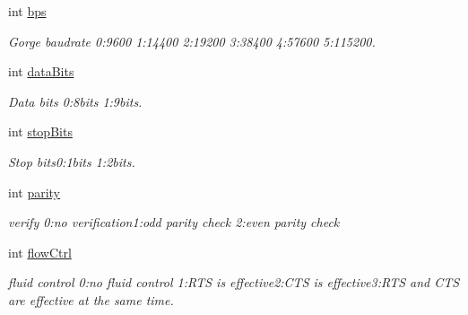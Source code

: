 \begin{DoxyCompactItemize}
\item 
\mbox{\label{struct_p_v_s_d_k___m_o_u_n_t_a_p_i___u_a_r_t___p_a_r_a_m_a2c76998e579016e645e9d7351b215848}} 
int \hyperlink{struct_p_v_s_d_k___m_o_u_n_t_a_p_i___u_a_r_t___p_a_r_a_m_a2c76998e579016e645e9d7351b215848}{bps}
\begin{DoxyCompactList}\small\item\em Gorge baudrate 0\+:9600 1\+:14400 2\+:19200 3\+:38400 4\+:57600 5\+:115200. \end{DoxyCompactList}\item 
\mbox{\label{struct_p_v_s_d_k___m_o_u_n_t_a_p_i___u_a_r_t___p_a_r_a_m_a4f993ce5de71d26d9b2575b02e913286}} 
int \hyperlink{struct_p_v_s_d_k___m_o_u_n_t_a_p_i___u_a_r_t___p_a_r_a_m_a4f993ce5de71d26d9b2575b02e913286}{data\+Bits}
\begin{DoxyCompactList}\small\item\em Data bits 0\+:8bits 1\+:9bits. \end{DoxyCompactList}\item 
\mbox{\label{struct_p_v_s_d_k___m_o_u_n_t_a_p_i___u_a_r_t___p_a_r_a_m_aaac56dc0268b74a17f2f08ccf86bd55c}} 
int \hyperlink{struct_p_v_s_d_k___m_o_u_n_t_a_p_i___u_a_r_t___p_a_r_a_m_aaac56dc0268b74a17f2f08ccf86bd55c}{stop\+Bits}
\begin{DoxyCompactList}\small\item\em Stop bits0\+:1bits 1\+:2bits. \end{DoxyCompactList}\item 
\mbox{\label{struct_p_v_s_d_k___m_o_u_n_t_a_p_i___u_a_r_t___p_a_r_a_m_a4915a6ae4a73e8cb311e907130c48e4a}} 
int \hyperlink{struct_p_v_s_d_k___m_o_u_n_t_a_p_i___u_a_r_t___p_a_r_a_m_a4915a6ae4a73e8cb311e907130c48e4a}{parity}
\begin{DoxyCompactList}\small\item\em verify 0\+:no verification1\+:odd parity check 2\+:even parity check \end{DoxyCompactList}\item 
\mbox{\label{struct_p_v_s_d_k___m_o_u_n_t_a_p_i___u_a_r_t___p_a_r_a_m_a6e26d54a066b903b461281d6fc8c6c2d}} 
int \hyperlink{struct_p_v_s_d_k___m_o_u_n_t_a_p_i___u_a_r_t___p_a_r_a_m_a6e26d54a066b903b461281d6fc8c6c2d}{flow\+Ctrl}
\begin{DoxyCompactList}\small\item\em fluid control 0\+:no fluid control 1\+:R\+TS is effective2\+:C\+TS is effective3\+:R\+TS and C\+TS are effective at the same time. \end{DoxyCompactList}\end{DoxyCompactItemize}


